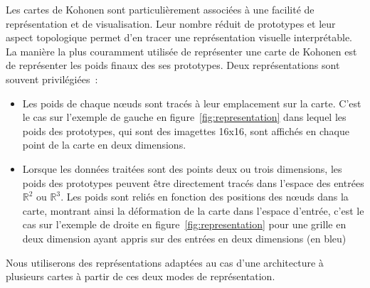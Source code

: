 \documentclass[../main]{subfiles}
\begin{document}
Les cartes de Kohonen sont particulièrement associées à une facilité de représentation et de visualisation. Leur nombre réduit de prototypes et leur aspect topologique permet d'en tracer une représentation visuelle interprétable.
La manière la plus couramment utilisée de représenter une carte de Kohonen est de représenter les poids finaux des ses prototypes. 
Deux représentations sont souvent privilégiées~:
\begin{itemize}
\item Les poids de chaque n\oe{}uds sont tracés à leur emplacement sur la carte. 
C'est le cas sur l'exemple de gauche en figure~\ref{fig:representation} dans lequel les poids des prototypes, qui sont des imagettes 16x16, sont affichés en chaque point de la carte en deux dimensions.
\item Lorsque les données traitées sont des points deux ou trois dimensions, les poids des prototypes peuvent être directement tracés dans l'espace des entrées $\mathbb{R}^2$ ou $\mathbb{R}^3$. Les poids sont reliés en fonction des positions des n\oe{}uds dans la carte, montrant ainsi la déformation de la carte dans l'espace d'entrée, c'est le cas sur l'exemple de droite en figure~\ref{fig:representation} pour une grille en deux dimension ayant appris sur des entrées en deux dimensions (en bleu)
\end{itemize}

Nous utiliserons des représentations adaptées au cas d'une architecture à plusieurs cartes à partir de ces deux modes de représentation.
\end{document}

